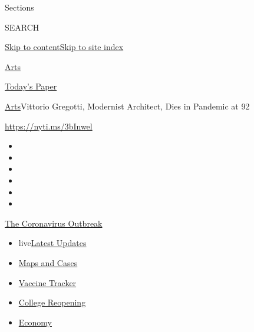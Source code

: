 Sections

SEARCH

\protect\hyperlink{site-content}{Skip to
content}\protect\hyperlink{site-index}{Skip to site index}

\href{https://www.nytimes3xbfgragh.onion/section/arts}{Arts}

\href{https://myaccount.nytimes3xbfgragh.onion/auth/login?response_type=cookie\&client_id=vi}{}

\href{https://www.nytimes3xbfgragh.onion/section/todayspaper}{Today's
Paper}

\href{/section/arts}{Arts}\textbar{}Vittorio Gregotti, Modernist
Architect, Dies in Pandemic at 92

\url{https://nyti.ms/3bInwel}

\begin{itemize}
\item
\item
\item
\item
\item
\item
\end{itemize}

\href{https://www.nytimes3xbfgragh.onion/news-event/coronavirus?action=click\&pgtype=Article\&state=default\&region=TOP_BANNER\&context=storylines_menu}{The
Coronavirus Outbreak}

\begin{itemize}
\tightlist
\item
  live\href{https://www.nytimes3xbfgragh.onion/2020/08/04/world/coronavirus-covid-19.html?action=click\&pgtype=Article\&state=default\&region=TOP_BANNER\&context=storylines_menu}{Latest
  Updates}
\item
  \href{https://www.nytimes3xbfgragh.onion/interactive/2020/us/coronavirus-us-cases.html?action=click\&pgtype=Article\&state=default\&region=TOP_BANNER\&context=storylines_menu}{Maps
  and Cases}
\item
  \href{https://www.nytimes3xbfgragh.onion/interactive/2020/science/coronavirus-vaccine-tracker.html?action=click\&pgtype=Article\&state=default\&region=TOP_BANNER\&context=storylines_menu}{Vaccine
  Tracker}
\item
  \href{https://www.nytimes3xbfgragh.onion/2020/08/02/us/covid-college-reopening.html?action=click\&pgtype=Article\&state=default\&region=TOP_BANNER\&context=storylines_menu}{College
  Reopening}
\item
  \href{https://www.nytimes3xbfgragh.onion/live/2020/08/03/business/stock-market-today-coronavirus?action=click\&pgtype=Article\&state=default\&region=TOP_BANNER\&context=storylines_menu}{Economy}
\end{itemize}

